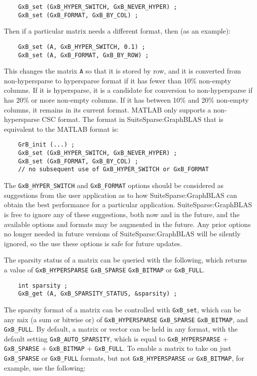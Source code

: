 \documentclass[12pt]{article}
\begin{document}
{\footnotesize
\begin{verbatim}
    GxB_set (GxB_HYPER_SWITCH, GxB_NEVER_HYPER) ;
    GxB_set (GxB_FORMAT, GxB_BY_COL) ;
\end{verbatim} }

Then if a particular matrix needs a different format, then (as an example):

{\footnotesize
\begin{verbatim}
    GxB_set (A, GxB_HYPER_SWITCH, 0.1) ;
    GxB_set (A, GxB_FORMAT, GxB_BY_ROW) ;
\end{verbatim} }

This changes the matrix \verb'A' so that it is stored by row, and it is
converted from non-hypersparse to hypersparse format if it has fewer than 10\%
non-empty columns.  If it is hypersparse, it is a candidate for conversion to
non-hypersparse if has 20\% or more non-empty columns.  If it has between 10\%
and 20\% non-empty columns, it remains in its current format.
MATLAB only supports a non-hypersparse CSC format.  The format in
SuiteSparse:GraphBLAS that is equivalent to the MATLAB format is:

{\footnotesize
\begin{verbatim}
    GrB_init (...) ;
    GxB_set (GxB_HYPER_SWITCH, GxB_NEVER_HYPER) ;
    GxB_set (GxB_FORMAT, GxB_BY_COL) ;
    // no subsequent use of GxB_HYPER_SWITCH or GxB_FORMAT
\end{verbatim} }

The \verb'GxB_HYPER_SWITCH' and \verb'GxB_FORMAT' options should be considered as
suggestions from the user application as to how SuiteSparse:GraphBLAS can
obtain the best performance for a particular application.
SuiteSparse:GraphBLAS is free to ignore any of these suggestions, both now and
in the future, and the available options and formats may be augmented in the
future.  Any prior options no longer needed in future versions of
SuiteSparse:GraphBLAS will be silently ignored, so the use these options is
safe for future updates.

The sparsity status of a matrix can be queried with the following, which
returns a value of \verb'GxB_HYPERSPARSE' \verb'GxB_SPARSE' \verb'GxB_BITMAP'
or \verb'GxB_FULL'.

{\footnotesize
\begin{verbatim}
    int sparsity ;
    GxB_get (A, GxB_SPARSITY_STATUS, &sparsity) ; \end{verbatim}}

The sparsity format of a matrix can be controlled with \verb'GxB_set', which
can be any mix (a sum or bitwise or) of \verb'GxB_HYPERSPARSE'
\verb'GxB_SPARSE' \verb'GxB_BITMAP', and \verb'GxB_FULL'.  By default, a matrix
or vector can be held in any format, with the default setting
\verb'GxB_AUTO_SPARSITY', which is equal to \verb'GxB_HYPERSPARSE' +
\verb'GxB_SPARSE' + \verb'GxB_BITMAP' + \verb'GxB_FULL'.  To enable a matrix to
take on just \verb'GxB_SPARSE' or \verb'GxB_FULL' formats, but not
\verb'GxB_HYPERSPARSE' or \verb'GxB_BITMAP', for example, use the following:
\end{document}
